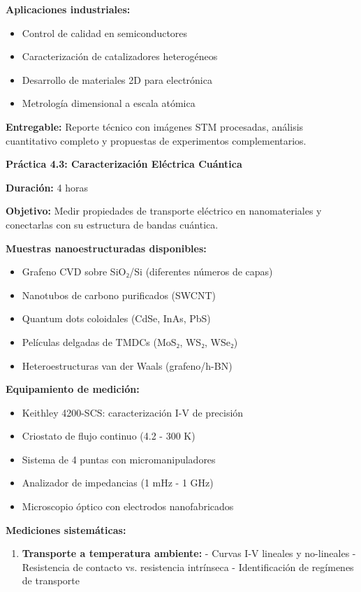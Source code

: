 \begin{tecnologiabox}
\begin{tecnologiabox}
\begin{tecnologiabox}
\begin{practicabox}
	\textbf{Aplicaciones industriales:}
	\begin{itemize}
		\item Control de calidad en semiconductores
		\item Caracterización de catalizadores heterogéneos
		\item Desarrollo de materiales 2D para electrónica
		\item Metrología dimensional a escala atómica
	\end{itemize}
	
	\textbf{Entregable:} Reporte técnico con imágenes STM procesadas, análisis cuantitativo completo y propuestas de experimentos complementarios.
\end{practicabox}

\begin{practicabox}
	\textbf{Práctica 4.3: Caracterización Eléctrica Cuántica}
	
	\textbf{Duración:} 4 horas
	
	\textbf{Objetivo:} Medir propiedades de transporte eléctrico en nanomateriales y conectarlas con su estructura de bandas cuántica.
	
	\textbf{Muestras nanoestructuradas disponibles:}
	\begin{itemize}
		\item Grafeno CVD sobre SiO₂/Si (diferentes números de capas)
		\item Nanotubos de carbono purificados (SWCNT)
		\item Quantum dots coloidales (CdSe, InAs, PbS)
		\item Películas delgadas de TMDCs (MoS₂, WS₂, WSe₂)
		\item Heteroestructuras van der Waals (grafeno/h-BN)
	\end{itemize}
	
	\textbf{Equipamiento de medición:}
	\begin{itemize}
		\item Keithley 4200-SCS: caracterización I-V de precisión
		\item Criostato de flujo continuo (4.2 - 300 K)
		\item Sistema de 4 puntas con micromanipuladores
		\item Analizador de impedancias (1 mHz - 1 GHz)
		\item Microscopio óptico con electrodos nanofabricados
	\end{itemize}
	
	\textbf{Mediciones sistemáticas:}
	\begin{enumerate}
		\item \textbf{Transporte a temperatura ambiente:}
		- Curvas I-V lineales y no-lineales
		- Resistencia de contacto vs. resistencia intrínseca
		- Identificación de regímenes de transporte
		

\end{enumerate}
\end{practicabox}
\end{tecnologiabox}
\end{tecnologiabox}
\end{tecnologiabox}
